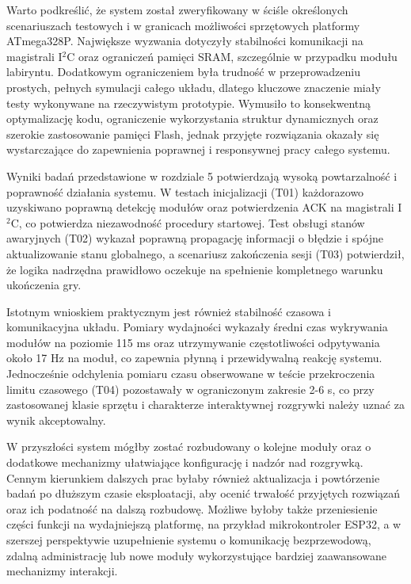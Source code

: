 \documentclass{SGGW-thesis}
\begin{document}
Warto podkreślić, że system został zweryfikowany w ściśle określonych scenariuszach testowych i w granicach możliwości sprzętowych platformy ATmega328P. Największe wyzwania dotyczyły stabilności komunikacji na magistrali I$^2$C oraz ograniczeń pamięci SRAM, szczególnie w przypadku modułu labiryntu. Dodatkowym ograniczeniem była trudność w przeprowadzeniu prostych, pełnych symulacji całego układu, dlatego kluczowe znaczenie miały testy wykonywane na rzeczywistym prototypie. Wymusiło to konsekwentną optymalizację kodu, ograniczenie wykorzystania struktur dynamicznych oraz szerokie zastosowanie pamięci Flash, jednak przyjęte rozwiązania okazały się wystarczające do zapewnienia poprawnej i responsywnej pracy całego systemu.

Wyniki badań przedstawione w rozdziale 5 potwierdzają wysoką powtarzalność i poprawność działania systemu. W testach inicjalizacji (T01) każdorazowo uzyskiwano poprawną detekcję modułów oraz potwierdzenia ACK na magistrali I$^2$C, co potwierdza niezawodność procedury startowej. Test obsługi stanów awaryjnych (T02) wykazał poprawną propagację informacji o błędzie i spójne aktualizowanie stanu globalnego, a scenariusz zakończenia sesji (T03) potwierdził, że logika nadrzędna prawidłowo oczekuje na spełnienie kompletnego warunku ukończenia gry.

Istotnym wnioskiem praktycznym jest również stabilność czasowa i komunikacyjna układu. Pomiary wydajności wykazały średni czas wykrywania modułów na poziomie 115 ms oraz utrzymywanie częstotliwości odpytywania około 17 Hz na moduł, co zapewnia płynną i przewidywalną reakcję systemu. Jednocześnie odchylenia pomiaru czasu obserwowane w teście przekroczenia limitu czasowego (T04) pozostawały w ograniczonym zakresie 2-6 s, co przy zastosowanej klasie sprzętu i charakterze interaktywnej rozgrywki należy uznać za wynik akceptowalny.

W przyszłości system mógłby zostać rozbudowany o kolejne moduły oraz o dodatkowe mechanizmy ułatwiające konfigurację i nadzór nad rozgrywką. Cennym kierunkiem dalszych prac byłaby również aktualizacja i powtórzenie badań po dłuższym czasie eksploatacji, aby ocenić trwałość przyjętych rozwiązań oraz ich podatność na dalszą rozbudowę. Możliwe byłoby także przeniesienie części funkcji na wydajniejszą platformę, na przykład mikrokontroler ESP32, a w szerszej perspektywie uzupełnienie systemu o komunikację bezprzewodową, zdalną administrację lub nowe moduły wykorzystujące bardziej zaawansowane mechanizmy interakcji.
\end{document}

